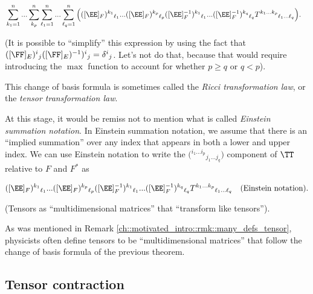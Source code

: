 \begin{theorem}
    \begin{align*}
        &\sum_{k_1 = 1}^n ... \sum_{k_p}^n \sum_{\ell_1 = 1}^n ... \sum_{\ell_q = 1}^n \Big( ([\EE]_F)^{k_1}{}_{\ell_1} ... ([\EE]_F)^{k_p}{}_{\ell_p}
        ([\EE]_F^{-1})^{k_1}{}_{\ell_1} ... ([\EE]_F^{-1})^{k_q}{}_{\ell_q} 
        T^{k_1 ... k_p}{}_{\ell_1 ... \ell_q}\Big).
    \end{align*}
    
    (It is possible to ``simplify'' this expression by using the fact that $([\FF]_E)^i{}_j ([\FF]_E)^{-1})^i{}_j = \delta^i{}_j$. Let's not do that, because that would require introducing the $\max$ function to account for whether $p \geq q$ or $q < p$).
    
    This change of basis formula is sometimes called the \textit{Ricci transformation law}, or the \textit{tensor transformation law}.
    
    At this stage, it would be remiss not to mention what is called \textit{Einstein summation notation}. In Einstein summation notation, we assume that there is an ``implied summation'' over any index that appears in both a lower and upper index. We can use Einstein notation to write the $\Big( {}^{i_1 ... i_p}{}_{j_1 ... j_q} \Big)$ component of $\TT$ relative to $F$ and $F^*$ as
    
    \begin{align*}
        ([\EE]_F)^{k_1}{}_{\ell_1} ... ([\EE]_F)^{k_p}{}_{\ell_p}
        ([\EE]_F^{-1})^{k_1}{}_{\ell_1} ... ([\EE]_F^{-1})^{k_q}{}_{\ell_q} 
        T^{k_1 ... k_p}{}_{\ell_1 ... \ell_q} \quad \text{(Einstein notation)}.
    \end{align*}
\end{theorem}

\begin{remark}
    (Tensors as ``multidimensional matrices'' that ``transform like tensors''). 
    
    As was mentioned in Remark \ref{ch::motivated_intro::rmk::many_defs_tensor}, physicists often define tensors to be ``multidimensional matrices'' that follow the change of basis formula of the previous theorem.
\end{remark}

\subsection*{Tensor contraction}

